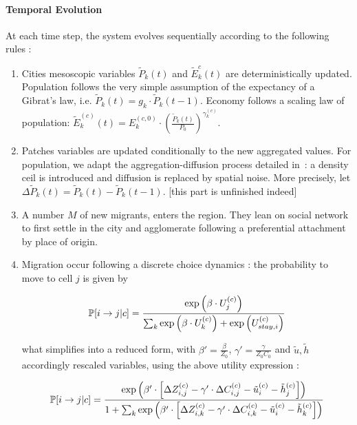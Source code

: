 \paragraph{Temporal Evolution}

At each time step, the system evolves sequentially according to the following rules :

\begin{enumerate}
\item Cities mesoscopic variables $\tilde{P}_k(t)$ and $\tilde{E}_k^{c}(t)$ are deterministically updated. Population follows the very simple assumption of the expectancy of a Gibrat's law, i.e. $\tilde{P}_k(t)= g_k \cdot \tilde{P}_k(t-1)$. Economy follows a scaling law of population: $\tilde{E}_k^{(c)}(t) = E_k^{(c,0)}\cdot \left(\frac{\tilde{P}_k(t)}{P_0}\right)^{\gamma_k^{(c)}}$.

\item Patches variables are updated conditionally to the new aggregated values. For population, we adapt the aggregation-diffusion process detailed in~\cite{raimbault2016calibration}: a density ceil is introduced and diffusion is replaced by spatial noise. More precisely, let $\Delta \tilde{P}_k(t) = \tilde{P}_k(t) - \tilde{P}_k(t-1)$. [this part is unfinished indeed]

\item A number $M$ of new migrants, enters the region. They lean on social network %
to first settle in the city and agglomerate following a preferential attachment by place of origin.
\item Migration occur following a discrete choice dynamics : the probability to move to cell $j$ is given by

\[
\operatorname{\mathbb{P}}\!\left[i\rightarrow j | c\right] = \frac{\exp{\left(\beta\cdot U_j^{(c)}\right)}}{\sum_k \exp{\left(\beta\cdot U_k^{(c)}\right)}+\exp{\left(U_{stay,i}^{(c)}\right)}}
\]

what simplifies into a reduced form, with $\beta' = \frac{\beta}{Z_0}$, $\gamma' = \frac{\gamma}{Z_0C_0}$ and $\tilde{u},\tilde{h}$ accordingly rescaled variables, using the above utility expression :

\[
\operatorname{\mathbb{P}}\!\left[i\rightarrow j | c\right] = \frac{\exp{\left(\beta'\cdot \left[\Delta Z_{i,j}^{(c)} - \gamma' \cdot \Delta C_{i,j}^{(c)} - \tilde{u}_i^{(c)} - \tilde{h}_j^{(c)} \right] \right)}}{1 + \sum_k {\exp{\left(\beta'\cdot \left[\Delta Z_{i,k}^{(c)} - \gamma' \cdot \Delta C_{i,k}^{(c)} - \tilde{u}_i^{(c)} - \tilde{h}_k^{(c)} \right] \right)}}}
\]


\end{enumerate}
